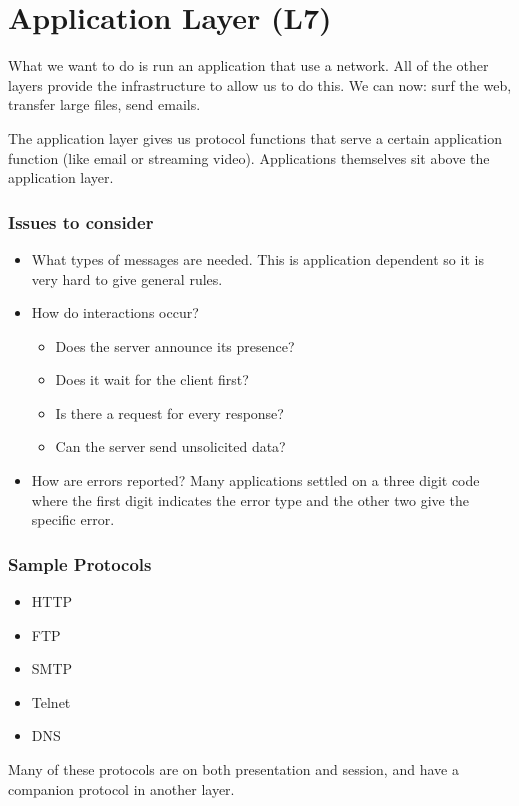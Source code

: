 \section{Application Layer (L7)}\label{sec:application_layer_l7_}

What we want to do is run an application that use a network.
All of the other layers provide the infrastructure to allow us to do this.
We can now: surf the web, transfer large files, send emails.

The application layer gives us protocol functions that serve a certain application function (like email or streaming video).
Applications themselves sit above the application layer.

\subsubsection{Issues to consider}\label{ssub:issues_to_consider}

\begin{itemize}
	\item What types of messages are needed.
	      This is application dependent so it is very hard to give general rules.
	\item How do interactions occur?
	      \begin{itemize}
		      \item Does the server announce its presence?
		      \item Does it wait for the client first?
		      \item Is there a request for every response?
		      \item Can the server send unsolicited data?
	      \end{itemize}
	\item How are errors reported?
	      Many applications settled on a three digit code where the first digit indicates the error type and the other two give the specific error.
\end{itemize}

\subsubsection{Sample Protocols}\label{ssub:sample_protocols}

\begin{itemize}
	\item HTTP
	\item FTP
	\item SMTP
	\item Telnet
	\item DNS
\end{itemize}
\begin{note}
	Many of these protocols are on both presentation and session, and have a companion protocol in another layer.
\end{note}

